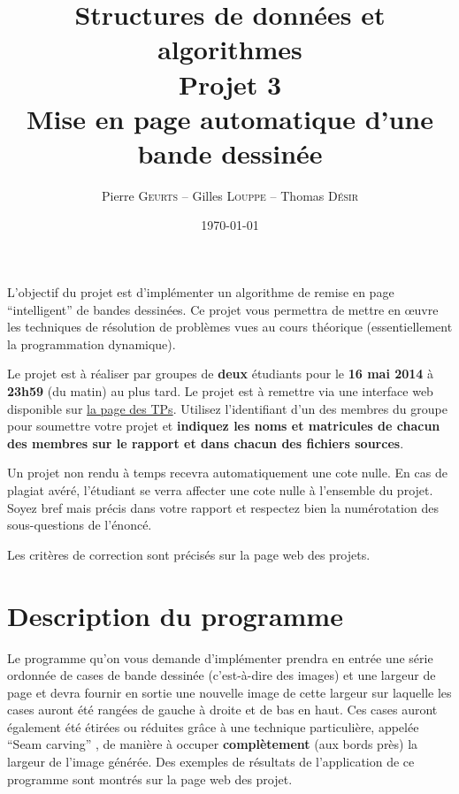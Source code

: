 \documentclass[a4paper,10pt]{article}
\title{
    \textbf{Structures de données et algorithmes}\\
    {Projet 3\\Mise en page automatique d'une bande dessinée}
}
\author{Pierre \textsc{Geurts} -- Gilles \textsc{Louppe} -- Thomas \textsc{Désir}}
\date{\today}
\begin{document}
\maketitle

L'objectif du projet est d'implémenter un algorithme de remise en page
``intelligent'' de bandes dessinées.  Ce projet vous permettra de
mettre en \oe uvre les techniques de résolution de problèmes vues au
cours théorique (essentiellement la programmation dynamique).

Le projet est à réaliser par groupes de {\bf deux} étudiants pour le
{\bf 16 mai 2014} à {\bf 23h59} (du matin) au plus tard. Le projet est
à remettre via une interface web disponible sur
\href{http://www.montefiore.ulg.ac.be/~glouppe/2012-2013/students.info0902.php}{la
  page des TPs}. Utilisez l'identifiant d'un des membres du groupe
pour soumettre votre projet et \textbf{indiquez les noms et matricules
  de chacun des membres sur le rapport et dans chacun des fichiers
  sources}.

Un projet non rendu à temps recevra automatiquement une cote nulle. En
cas de plagiat avéré, l'étudiant se verra affecter une cote nulle à
l'ensemble du projet. Soyez bref mais précis dans votre rapport et
respectez bien la numérotation des sous-questions de l'énoncé.

Les critères de correction sont précisés sur la page web des projets.

\section{Description du programme}

Le programme qu'on vous demande d'implémenter prendra en entrée une
série ordonnée de cases de bande dessinée (c'est-à-dire des images) et
une largeur de page et devra fournir en sortie une nouvelle image de
cette largeur sur laquelle les cases auront été rangées de gauche à
droite et de bas en haut. Ces cases auront également été étirées ou
réduites grâce à une technique particulière, appelée ``Seam carving''
\cite{seamcarving}, de manière à occuper {\bf complètement} (aux bords
près) la largeur de l'image générée. Des exemples de résultats de
l'application de ce programme sont montrés sur la page web des projet.
\end{document}
